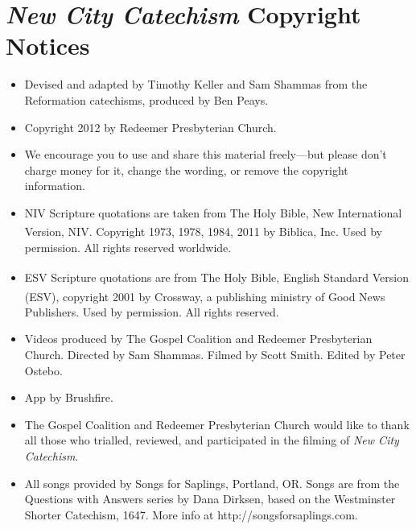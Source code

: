 \documentclass[titlepage]{memoir}
\begin{document}
\cleardoublepage

\section*{{\em New City Catechism}\/ Copyright Notices}

\begin{itemize}
	\item Devised and adapted by Timothy Keller and Sam Shammas from the Reformation catechisms, produced by Ben Peays.
	\item Copyright {\textcopyright} 2012 by Redeemer Presbyterian Church.
	\item We encourage you to use and share this material freely\thinspace{}---\thinspace{}but please don't charge money for it, change the wording, or remove the copyright information.
	\item NIV Scripture quotations are taken from The Holy Bible, New International Version,\textsuperscript{{\textregistered}} NIV\textsuperscript{{\textregistered}}. Copyright {\textcopyright} 1973, 1978, 1984, 2011 by Biblica, Inc.{\texttrademark} Used by permission. All rights reserved worldwide.
	\item ESV Scripture quotations are from The Holy Bible, English Standard Version\textsuperscript{{\textregistered}} (ESV\textsuperscript{{\textregistered}}), copyright {\textcopyright} 2001 by Crossway, a publishing ministry of Good News Publishers. Used by permission. All rights reserved.
	\item Videos produced by The Gospel Coalition and Redeemer Presbyterian Church. Directed by Sam Shammas. Filmed by Scott Smith. Edited by Peter Ostebo.
	\item App by Brushfire.
	\item The Gospel Coalition and Redeemer Presbyterian Church would like to thank all those who trialled, reviewed, and participated in the filming of {\em New City Catechism}.
	\item All songs provided by Songs for Saplings, Portland, OR. Songs are from the Questions with Answers series by Dana Dirksen, based on the Westminster Shorter Catechism, 1647. More info at http:\slash{}\slash{}songs\hspace{0em}for\hspace{0em}sap\hspace{0em}lings.com.
\end{itemize}

\cleardoublepage

\setcounter{tocdepth}{2}
\end{document}
